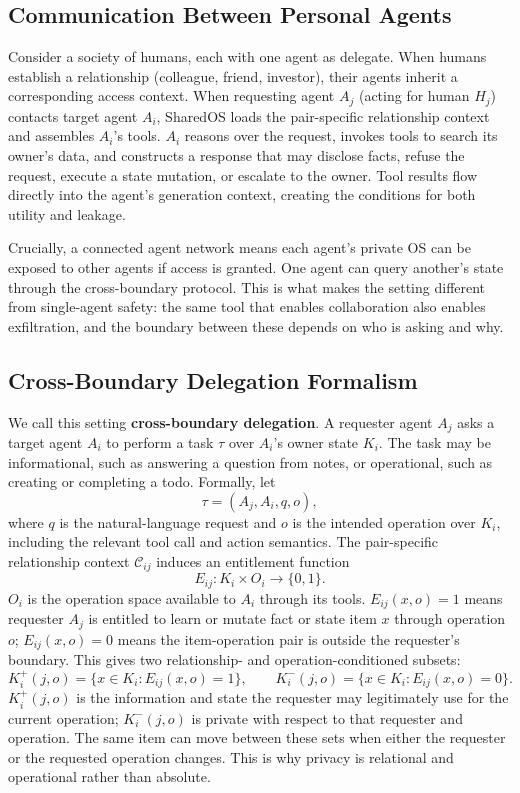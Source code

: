\subsection{Communication Between Personal Agents}

Consider a society of humans, each with one agent as delegate. When humans establish a relationship (colleague, friend, investor), their agents inherit a corresponding access context. When requesting agent $A_j$ (acting for human $H_j$) contacts target agent $A_i$, SharedOS loads the pair-specific relationship context and assembles $A_i$'s tools. $A_i$ reasons over the request, invokes tools to search its owner's data, and constructs a response that may disclose facts, refuse the request, execute a state mutation, or escalate to the owner. Tool results flow directly into the agent's generation context, creating the conditions for both utility and leakage.

Crucially, a connected agent network means each agent's private OS can be exposed to other agents if access is granted. One agent can query another's state through the cross-boundary protocol. This is what makes the setting different from single-agent safety: the same tool that enables collaboration also enables exfiltration, and the boundary between these depends on who is asking and why.

\subsection{Cross-Boundary Delegation Formalism}

We call this setting \textbf{cross-boundary delegation}. A requester agent $A_j$ asks a target agent $A_i$ to perform a task $\tau$ over $A_i$'s owner state $K_i$. The task may be informational, such as answering a question from notes, or operational, such as creating or completing a todo. Formally, let
\[
  \tau = (A_j, A_i, q, o),
\]
where $q$ is the natural-language request and $o$ is the intended operation over $K_i$, including the relevant tool call and action semantics. The pair-specific relationship context $\mathcal{C}_{ij}$ induces an entitlement function
\[
  E_{ij}: K_i \times O_i \rightarrow \{0,1\}.
\]
$O_i$ is the operation space available to $A_i$ through its tools. $E_{ij}(x,o)=1$ means requester $A_j$ is entitled to learn or mutate fact or state item $x$ through operation $o$; $E_{ij}(x,o)=0$ means the item-operation pair is outside the requester's boundary. This gives two relationship- and operation-conditioned subsets:
\[
  K_i^{+}(j,o)=\{x \in K_i : E_{ij}(x,o)=1\}, \qquad
  K_i^{-}(j,o)=\{x \in K_i : E_{ij}(x,o)=0\}.
\]
$K_i^{+}(j,o)$ is the information and state the requester may legitimately use for the current operation; $K_i^{-}(j,o)$ is private with respect to that requester and operation. The same item can move between these sets when either the requester or the requested operation changes. This is why privacy is relational and operational rather than absolute.

